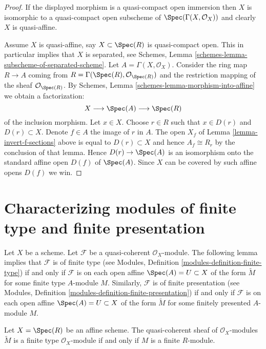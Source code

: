 \begin{proof}
If the displayed morphism is a quasi-compact open immersion then
$X$ is isomorphic to a quasi-compact open subscheme of
$\Spec(\Gamma(X, \mathcal{O}_X))$ and clearly $X$ is quasi-affine.

\medskip\noindent
Assume $X$ is quasi-affine, say $X \subset \Spec(R)$ is
quasi-compact open. This in particular implies that $X$ is
separated, see
Schemes, Lemma \ref{schemes-lemma-subscheme-of-separated-scheme}.
Let $A = \Gamma(X, \mathcal{O}_X)$.
Consider the ring map $R \to A$ coming from
$R = \Gamma(\Spec(R), \mathcal{O}_{\Spec(R)})$
and the restriction mapping of the sheaf $\mathcal{O}_{\Spec(R)}$.
By Schemes, Lemma \ref{schemes-lemma-morphism-into-affine}
we obtain a factorization:
$$
X \longrightarrow
\Spec(A) \longrightarrow
\Spec(R)
$$
of the inclusion morphism. Let $x \in X$. Choose $r \in R$ such that
$x \in D(r)$ and $D(r) \subset X$. Denote $f \in A$ the image of $r$
in $A$. The open $X_f$ of Lemma \ref{lemma-invert-f-sections}
above is equal to $D(r) \subset X$ and hence $A_f \cong R_r$ by the
conclusion of that lemma.
Hence $D(r) \to \Spec(A)$ is an isomorphism onto the
standard affine open $D(f)$ of $\Spec(A)$. Since $X$
can be covered by such affine opens $D(f)$ we win.
\end{proof}









\section{Characterizing modules of finite type and finite presentation}
\label{section-characterizing-finite-type-presentation}

\noindent
Let $X$ be a scheme.
Let $\mathcal{F}$ be a quasi-coherent $\mathcal{O}_X$-module.
The following lemma implies that $\mathcal{F}$ is of finite type
(see Modules, Definition \ref{modules-definition-finite-type})
if and only if $\mathcal{F}$ is
on each open affine $\Spec(A) = U \subset X$
of the form $\widetilde M$ for some finite type $A$-module $M$.
Similarly, $\mathcal{F}$ is of finite presentation
(see Modules, Definition \ref{modules-definition-finite-presentation})
if and only if $\mathcal{F}$ is
on each open affine $\Spec(A) = U \subset X$
of the form $\widetilde M$ for some finitely presented $A$-module $M$.

\begin{lemma}
\label{lemma-finite-type-module}
Let $X = \Spec(R)$ be an affine scheme.
The quasi-coherent sheaf of $\mathcal{O}_X$-modules
$\widetilde M$ is a finite type $\mathcal{O}_X$-module
if and only if $M$ is a finite $R$-module.
\end{lemma}

